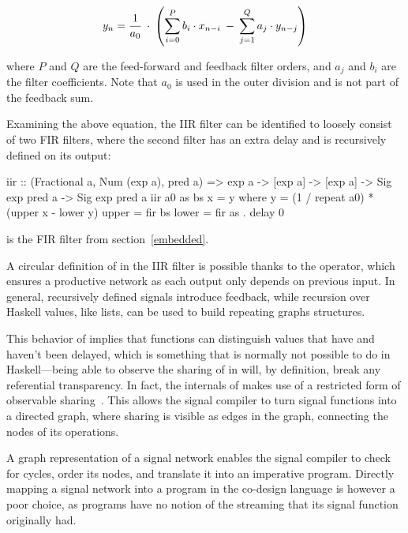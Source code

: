 \documentclass[../paper.tex]{subfiles}
\begin{document}
\begin{equation}
y_{n} = {1 \over a_{0}} \: \cdot \: \left( \sum_{i=0}^{P} b_{i} \cdot x_{n-i} \: - \: \sum_{j=1}^{Q} a_{j} \cdot y_{n-j} \right)
\end{equation}
\vspace{1mm}

\noindent where $P$ and $Q$ are the feed-forward and feedback filter orders, and $a_{j}$ and $b_{i}$ are the filter coefficients. Note that $a_{0}$ is used in the outer division and is not part of the feedback sum.

Examining the above equation, the IIR filter can be identified to loosely consist of two FIR filters, where the second filter has an extra delay and is recursively defined on its output:

\begin{code}
iir :: (Fractional a, Num (exp a), pred a) => exp a -> [exp a] -> [exp a] ->
  Sig exp pred a -> Sig exp pred a
iir a0 as bs x = y
  where
    y = (1 / repeat a0) * (upper x - lower y)
    upper = fir bs
    lower = fir as . delay 0
\end{code}

\noindent {} is the FIR filter from section~\ref{embedded}.

A circular definition of  in the IIR filter is possible thanks to the  operator, which ensures a productive network as each output only depends on previous input. In general, recursively defined signals introduce feedback, while recursion over Haskell values, like lists, can be used to build repeating graphs structures.

This behavior of  implies that functions can distinguish values that have and haven't been delayed, which is something that is normally not possible to do in Haskell---being able to observe the sharing of  in  will, by definition, break any referential transparency. In fact, the internals of  makes use of a restricted form of observable sharing~\cite{claessen1999, gill2009}. This allows the signal compiler to turn signal functions into a directed graph, where sharing is visible as edges in the graph, connecting the nodes of its operations.

A graph representation of a signal network enables the signal compiler to check for cycles, order its nodes, and translate it into an imperative program. Directly mapping a signal network into a program in the co-design language is however a poor choice, as programs have no notion of the streaming that its signal function originally had.
\end{document}
